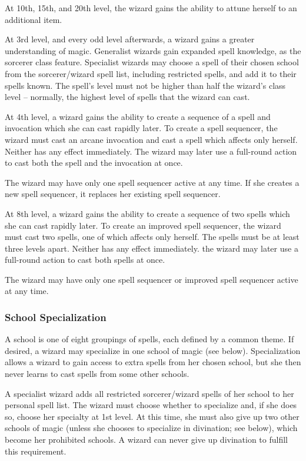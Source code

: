 \par At 10th, 15th, and 20th level, the wizard gains the ability to attune herself to an additional item.

 At 3rd level, and every odd level afterwards, a wizard gains a greater understanding of magic. Generalist wizards gain expanded spell knowledge, as the sorcerer class feature. Specialist wizards may choose a spell of their chosen school from the sorcerer/wizard spell list, including restricted spells, and add it to their spells known. The spell's level must not be higher than half the wizard's class level -- normally, the highest level of spells that the wizard can cast.

 At 4th level, a wizard gains the ability to create a sequence of a spell and invocation which she can cast rapidly later. To create a spell sequencer, the wizard must cast an arcane invocation and cast a spell which affects only herself. Neither has any effect immediately. The wizard may later use a full-round action to cast both the spell and the invocation at once.
\par The wizard may have only one spell sequencer active at any time. If she creates a new spell sequencer, it replaces her existing spell sequencer.

 At 8th level, a wizard gains the ability to create a sequence of two spells which she can cast rapidly later. To create an improved spell sequencer, the wizard must cast two spells, one of which affects only herself. The spells must be at least three levels apart. Neither has any effect immediately. the wizard may later use a full-round action to cast both spells at once.
\par The wizard may have only one spell sequencer or improved spell sequencer active at any time.

 \subsubsection{School Specialization}
A school is one of eight groupings of spells, each defined by a common theme. If desired, a wizard may specialize in one school of magic (see below). Specialization allows a wizard to gain access to extra spells from her chosen school, but she then never learns to cast spells from some other schools.

\par A specialist wizard adds all restricted sorcerer/wizard spells of her school to her personal spell list.  The wizard must choose whether to specialize and, if she does so, choose her specialty at 1st level. At this time, she must also give up two other schools of magic (unless she chooses to specialize in divination; see below), which become her prohibited schools. A wizard can never give up divination to fulfill this requirement.

